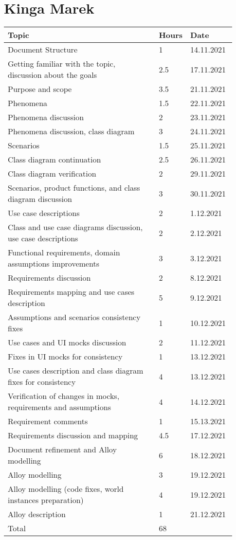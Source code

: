 \section*{Kinga Marek}
\begin{longtable}{@{}p{0.67\linewidth} p{0.06\linewidth} p{0.20\linewidth}@{}}
    \toprule[1.5pt]
    Topic &  Hours & Date \\ \hline
    Document Structure & 1 & 14.11.2021 \\ 
    Getting familiar with the topic, discussion about the goals & 2.5 & 17.11.2021 \\ 
    Purpose and scope & 3.5 & 21.11.2021 \\
    Phenomena & 1.5 & 22.11.2021 \\ 
    Phenomena discussion & 2 & 23.11.2021 \\
    Phenomena discussion, class diagram & 3 & 24.11.2021 \\ 
    Scenarios & 1.5 & 25.11.2021 \\ 
    Class diagram continuation & 2.5 & 26.11.2021 \\
    Class diagram verification & 2 & 29.11.2021 \\
    Scenarios, product functions, and class diagram discussion & 3 & 30.11.2021\\ 
    Use case descriptions & 2 & 1.12.2021\\
    Class and use case diagrams discussion, use case descriptions & 2 & 2.12.2021\\
    Functional requirements, domain assumptions improvements & 3 & 3.12.2021\\
    Requirements discussion & 2 & 8.12.2021\\
    Requirements mapping and use cases description & 5 & 9.12.2021\\
    Assumptions and scenarios consistency fixes & 1 & 10.12.2021\\
    Use cases and UI mocks discussion & 2 & 11.12.2021\\
    Fixes in UI mocks for consistency & 1 & 13.12.2021\\
    Use cases description and class diagram fixes for consistency & 4 & 13.12.2021\\
    Verification of changes in mocks, requirements and assumptions & 4 & 14.12.2021\\
    Requirement comments & 1 & 15.13.2021 \\
    Requirements discussion and mapping & 4.5 & 17.12.2021\\
    Document refinement and Alloy modelling & 6 & 18.12.2021\\
    Alloy modelling & 3 & 19.12.2021\\
    Alloy modelling (code fixes, world instances preparation) & 4 & 19.12.2021\\
    Alloy description & 1 & 21.12.2021 \\
    \hline
    Total & 68 & \\ 
    \bottomrule[1.5pt]
\end{longtable}